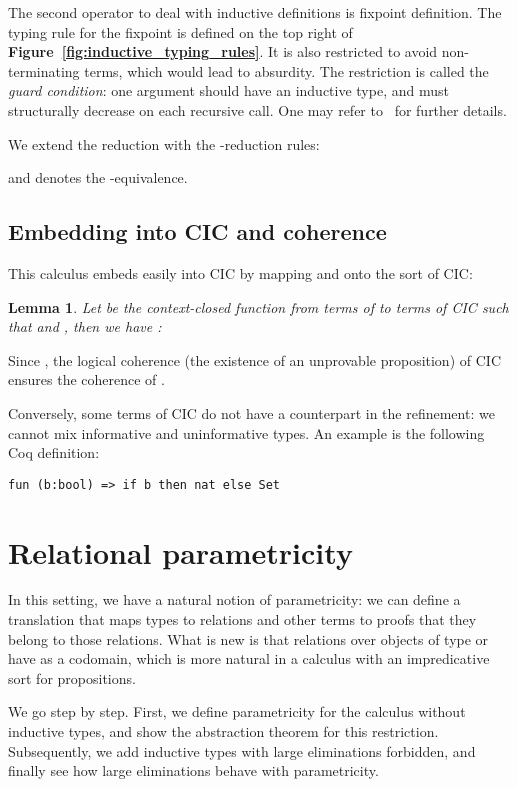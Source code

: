 \documentclass[a4paper,USenglish]{lipics}
\newtheorem{lem}{Lemma}
\def\coq{\textsf{Coq}\xspace}
\def\cic{\textsf{CIC}\xspace}
\def\cicr{\xspace}
\begin{document}
The second operator to deal with inductive definitions is fixpoint definition. The typing
rule for the fixpoint is defined on the top right of
\textsf{\textbf{\small Figure~\ref{fig:inductive_typing_rules}}}. It is also restricted to avoid
non-terminating terms, which would lead to absurdity. The restriction is
called the \emph{guard condition}: one argument should have an inductive
type, and must structurally decrease on each recursive call. One may
refer to~\cite{Gimenez95} for further details.

We extend the reduction with the -reduction rules:

and  denotes the -equivalence.

\subsection{Embedding \cicr into \cic and coherence}

This calculus embeds easily into \cic by mapping  and 
onto the sort  of \cic:
\begin{lem}
Let  be the context-closed function from terms of \cicr to terms
of \cic such that  and , then
we have :

\end{lem}
Since , the logical coherence (the existence of an
unprovable proposition) of \cic ensures the coherence of \cicr.

Conversely, some terms of \cic do not have a counterpart in the
refinement: we cannot mix informative and uninformative types. An
example is the following \coq definition:
\begin{lstlisting}
fun (b:bool) => if b then nat else Set
\end{lstlisting}


\section{Relational parametricity}\label{sec:parametricity}

In this setting, we have a natural notion of parametricity: we can
define a translation that maps types to relations and other terms to
proofs that they belong to those relations. What is new is that
relations over objects of type  or  have  as a
codomain, which is more natural in a calculus with an impredicative sort
for propositions.

We go step by step. First, we define parametricity for the calculus
without inductive types, and show the abstraction theorem for this
restriction. Subsequently, we add inductive types with large
eliminations forbidden, and finally see how large eliminations behave
with parametricity.
\end{document}
